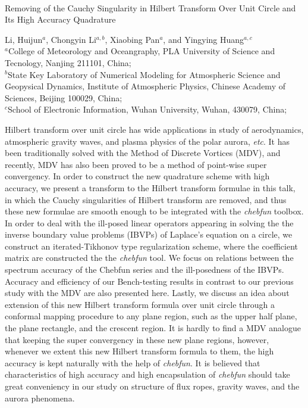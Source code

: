 \documentclass[11pt]{article}
\begin{document}
 \begin{center}
   {\sf ~\\[14pt]
 Removing of the Cauchy Singularity in Hilbert Transform Over Unit Circle and Its High Accuracy Quadrature%
     }
 \end{center}
 \footnotesize{
   \begin{center}
Li, Huijun$^a$, Chongyin Li$^{a, b}$, Xiaobing Pan$^a$, and Yingying Huang$^{a, c}$\\[14pt]

$^a$College of Meteorology and Oceangraphy, PLA University of Science and Tecnology, Nanjing {\rm 211101}, China;\\[3mm]

$^b$State Key Laboratory of Numerical Modeling for Atmospheric Science and Geopysical Dynamics, Institute of Atmospheric Physics, Chinese Academy of Sciences, Beijing {\rm 100029}, China;\\[3mm]

$^c$School of Electronic Information, Wuhan University, Wuhan, 430079, China;
   \end{center}
   }


 \normalsize
 \noindent
Hilbert transform over unit circle has wide applications in study of aerodynamics, atmospheric gravity waves, and plasma physics of the polar aurora, {\it etc}.  It has been traditionally solved with the Method of Discrete Vortices (MDV),  and recently, MDV has also been proved to be a method of point-wise super convergency. In order to construct the new quadrature scheme with high accuracy, we present a transform to the Hilbert transform formulae in this talk, in which the Cauchy singularities of Hilbert transform are removed, and thus these new formulae are smooth enough to be integrated with the {\it chebfun} toolbox. In order to deal with the ill-posed linear operators appearing in solving the the inverse boundary value problems (IBVPs) of Laplace’s equation on a circle, we construct an iterated-Tikhonov type regularization scheme, where the coefficient matrix are constructed the the {\it chebfun} tool. We focus on relations between the spectrum  accuracy of the Chebfun series and the ill-posedness of the IBVPs.  Accuracy and efficiency of our Bench-testing results in contrast to our previous study with the MDV are also presented here. Lastly, we discuss an idea about extension of this new Hilbert transform formula over unit circle through a conformal mapping procedure to any plane region, such as the upper half plane, the plane rectangle, and the crescent region. It is hardly to find a MDV analogue that keeping the super convergency in these new plane regions, however,  whenever we extent this new Hilbert transform formula to them, the high accuracy is kept naturally with the help of {\it chebfun}. It is believed that characteristics of  high accuracy and high encapsulation of  {\it chebfun} should take great conveniency in our study on structure of flux ropes, gravity waves, and the aurora phenomena.
\end{document}
